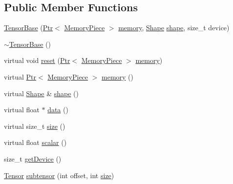 \subsection*{Public Member Functions}
\begin{DoxyCompactItemize}
\item 
\hyperlink{classmarian_1_1TensorBase_a1542be522ca1bdfb1c314580859b8982}{Tensor\+Base} (\hyperlink{namespacemarian_ad1a373be43a00ef9ce35666145137b08}{Ptr}$<$ \hyperlink{classmarian_1_1MemoryPiece}{Memory\+Piece} $>$ \hyperlink{classmarian_1_1TensorBase_a0fef86a2f4c3704c38cbe3aa6d11b113}{memory}, \hyperlink{structmarian_1_1Shape}{Shape} \hyperlink{classmarian_1_1TensorBase_adbee0ca45fa5a195171a99fc7a9b00c8}{shape}, size\+\_\+t device)
\item 
\hyperlink{classmarian_1_1TensorBase_a3a7c371bb0c969d5984ab976518b8dee}{$\sim$\+Tensor\+Base} ()
\item 
virtual void \hyperlink{classmarian_1_1TensorBase_af507312f77caa146a8c0bf13eaf96bd4}{reset} (\hyperlink{namespacemarian_ad1a373be43a00ef9ce35666145137b08}{Ptr}$<$ \hyperlink{classmarian_1_1MemoryPiece}{Memory\+Piece} $>$ \hyperlink{classmarian_1_1TensorBase_a0fef86a2f4c3704c38cbe3aa6d11b113}{memory})
\item 
virtual \hyperlink{namespacemarian_ad1a373be43a00ef9ce35666145137b08}{Ptr}$<$ \hyperlink{classmarian_1_1MemoryPiece}{Memory\+Piece} $>$ \hyperlink{classmarian_1_1TensorBase_a0fef86a2f4c3704c38cbe3aa6d11b113}{memory} ()
\item 
virtual \hyperlink{structmarian_1_1Shape}{Shape} \& \hyperlink{classmarian_1_1TensorBase_adbee0ca45fa5a195171a99fc7a9b00c8}{shape} ()
\item 
virtual float $\ast$ \hyperlink{classmarian_1_1TensorBase_a67e5b255f621fbae8152d5e75dbb2339}{data} ()
\item 
virtual size\+\_\+t \hyperlink{classmarian_1_1TensorBase_ae4a6d6a80b85704484a5f21b9c1506d0}{size} ()
\item 
virtual float \hyperlink{classmarian_1_1TensorBase_aa627fcb0c643d0ef671973ca2c9ecd3b}{scalar} ()
\item 
size\+\_\+t \hyperlink{classmarian_1_1TensorBase_a7b8de35867bf1502ae1c8393670686fe}{get\+Device} ()
\item 
\hyperlink{namespacemarian_a88b71ec34bb354564cddc24eb80f7e14}{Tensor} \hyperlink{classmarian_1_1TensorBase_ac2b98828c27c5900889acab2c6887ae0}{subtensor} (int offset, int \hyperlink{classmarian_1_1TensorBase_ae4a6d6a80b85704484a5f21b9c1506d0}{size})
\item 

\end{DoxyCompactItemize}
